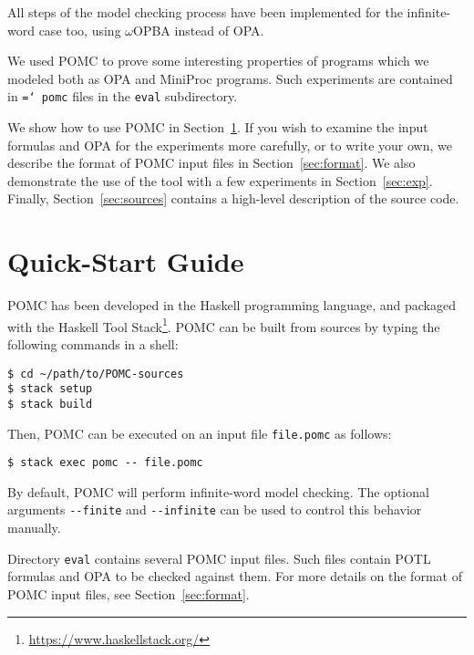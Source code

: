 \documentclass[9pt,a4paper]{article}
\begin{document}
All steps of the model checking process have been implemented
for the infinite-word case too, using $\omega$OPBA instead of OPA.

We used POMC to prove some interesting properties of programs which we
modeled both as OPA and MiniProc programs. Such experiments are contained in
\texttt{\hyphenchar\font=`\-
  pomc}
files in the \texttt{eval} subdirectory.

We show how to use POMC in Section~\ref{sec:quick-start}.
If you wish to examine the input formulas and OPA for the experiments more carefully,
or to write your own, we describe the format of POMC input files in Section~\ref{sec:format}.
We also demonstrate the use of the tool with a few experiments in Section~\ref{sec:exp}.
Finally, Section~\ref{sec:sources} contains a high-level description of the source code.


\section{Quick-Start Guide}
\label{sec:quick-start}

POMC has been developed in the Haskell programming language,
and packaged with the Haskell Tool Stack\footnote{\url{https://www.haskellstack.org/}}.
POMC can be built from sources by typing the following commands in a shell:
\begin{verbatim}
$ cd ~/path/to/POMC-sources
$ stack setup
$ stack build
\end{verbatim}
Then, POMC can be executed on an input file \verb|file.pomc| as follows:
\begin{verbatim}
$ stack exec pomc -- file.pomc
\end{verbatim}

By default, POMC will perform infinite-word model checking.
The optional arguments \verb|--finite| and \verb|--infinite|
can be used to control this behavior manually.

Directory \verb|eval| contains several POMC input files. Such files
contain POTL formulas and OPA to be checked against them. For more
details on the format of POMC input files, see
Section~\ref{sec:format}.
\end{document}
